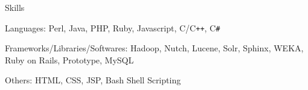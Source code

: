 \documentclass{resume}
\begin{document}
\begin{category}{Skills}{}

    \item {\topic Languages:} Perl, Java, PHP, Ruby, Javascript, C/C{\tt ++},
        C{\tt \#}

    \item {\topic Frameworks/Libraries/Softwares:} Hadoop, Nutch, Lucene, Solr,
        Sphinx, WEKA, Ruby on Rails, Prototype, MySQL

    \item {\topic Others:} HTML, CSS, JSP, Bash Shell Scripting

\end{category}


\end{document}
